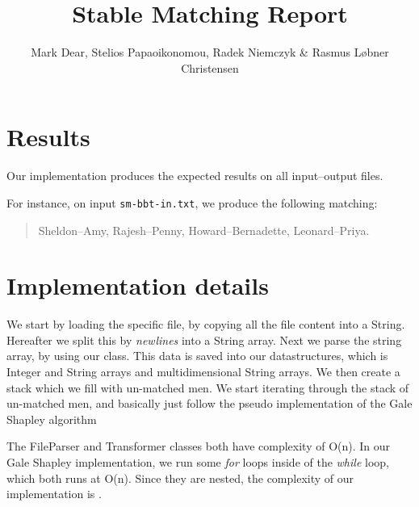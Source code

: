 \documentclass{tufte-handout}
\title{Stable Matching Report}
\author{Mark Dear, Stelios Papaoikonomou, Radek Niemczyk & Rasmus Løbner Christensen}
\begin{document}
  \maketitle

  \section{Results}

  Our implementation produces the expected results on all input--output files. 
 
  For instance, on input {\tt sm-bbt-in.txt}, we produce the following matching:
  \begin{quotation}
    Sheldon--Amy, Rajesh--Penny, Howard--Bernadette, Leonard--Priya. 
  \end{quotation}

  \section{Implementation details}
  
  We start by loading the specific file, by copying all the file content into a String. Hereafter we split this by \textit{newlines} into a String array.
  Next we parse the string array, by using our class. This data is saved into our datastructures, which is Integer and
  String arrays and multidimensional String arrays. We then create a stack which we fill with un-matched men. 
  We start iterating through the stack of un-matched men, and basically just follow the pseudo implementation of the Gale Shapley algorithm 
  
  The FileParser and Transformer classes both have complexity of O(n). In our Gale Shapley implementation, we run some \textit{for} loops inside of the \textit{while} loop,
  which both runs at O(n). Since they are nested, the complexity of our implementation is . 
\end{document}
